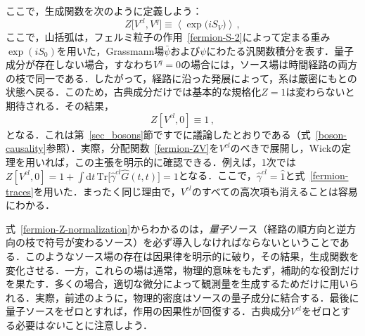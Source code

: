 \documentclass[a4paper,11pt]{ltjsarticle}
\def\Tr{\mathrm{Tr}}
\def\d{\mathrm{d}}
\begin{document}
ここで，生成関数を次のように定義しよう：
\begin{equation}\label{fermion-ZV}
Z\big[V^{cl},V^{q}\big]\equiv\left\langle\exp\big(iS_{V}\big)\right\rangle\,,
\end{equation}
ここで，山括弧は，フェルミ粒子の作用~\eqref{fermion-S-2}によって定まる重み$\exp(iS_{0})$を用いた，Grassmann場$\bar{\psi}$および$\psi$にわたる汎関数積分を表す．量子成分が存在しない場合，すなわち$V^{q}=0$の場合には，ソース場は時間経路の両方の枝で同一である．したがって，経路に沿った発展によって，系は厳密にもとの状態へ戻る．このため，古典成分だけでは基本的な規格化$Z=1$は変わらないと期待される．その結果，
\begin{equation}\label{fermion-Z-normalization}
Z[V^{cl}, 0]\equiv1\, ,
\end{equation}
となる．これは第~\ref{sec_bosons}節ですでに議論したとおりである（式~\eqref{boson-causality}参照）．実際，分配関数~\eqref{fermion-ZV}を$V^{cl}$のべきで展開し，Wickの定理を用いれば，この主張を明示的に確認できる．例えば，1次では$Z[V^{cl},0]=1+\int \d t\,
\Tr\big[\hat{\gamma}^{cl}\hat{G}(t,t)\big]=1$となる．ここで，$\hat{\gamma}^{cl}=\hat 1$と式~\eqref{fermion-traces}を用いた．まったく同じ理由で，$V^{cl}$のすべての高次項も消えることは容易にわかる．



式~\eqref{fermion-Z-normalization}からわかるのは，{\em 量子}ソース（経路の順方向と逆方向の枝で符号が変わるソース）を必ず導入しなければならないということである．このようなソース場の存在は因果律を明示的に破り，その結果，生成関数を変化させる．一方，これらの場は通常，物理的意味をもたず，補助的な役割だけを果たす．多くの場合，適切な微分によって観測量を生成するためだけに用いられる．実際，前述のように，物理的密度はソースの量子成分に結合する．最後に量子ソースをゼロとすれば，作用の因果性が回復する．古典成分$V^{cl}$をゼロとする必要は{\em ない}ことに注意しよう．
\end{document}

